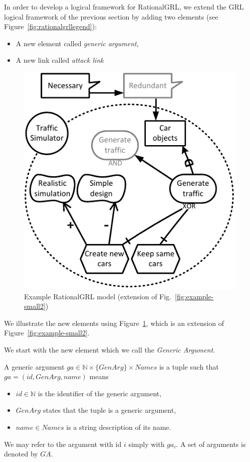 In order to develop a logical framework for RationalGRL, we extend the GRL logical framework of the previous section by adding two elements (see Figure~\ref{fig:rationalgrllegend}):
\begin{itemize}
\item A new element called \emph{generic argument},
\item A new link called \emph{attack link}
\end{itemize}

\begin{figure}[ht]
\centering
\includegraphics[width=\columnwidth]{img/Example1-new-attack.pdf}
\caption{Example RationalGRL model (extension of Fig.~\ref{fig:example-small2})}
\label{fig:example-small3}
\end{figure} 

We illustrate the new elements using Figure~\ref{fig:example-small3}, which is an extension of Figure~\ref{fig:example-small2}. 

We start with the new element which we call the \emph{Generic Argument}.

\begin{definition}
\label{def:generic-argument}
A generic argument $ga \in \mathbb{N}\times \{GenArg\}\times Names$ is a tuple such that $ga=(id, GenArg, name)$ means
\begin{itemize}
\item $id\in \mathbb{N}$ is the identifier of the generic argument,
\item $GenArg$ states that the tuple is a generic argument,
\item $name\in Names$ is a string description of its name.
\end{itemize}
We may refer to the argument with id $i$ simply with $ga_i$. A set of arguments is denoted by $GA$.
\end{definition}

